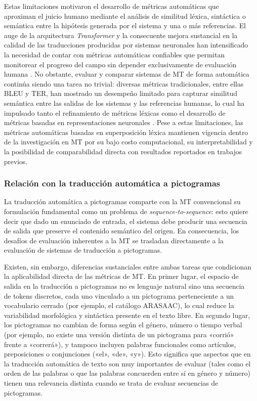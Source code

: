 Estas limitaciones motivaron el desarrollo de métricas automáticas que aproximan el juicio humano mediante el análisis de similitud léxica, sintáctica o semántica entre la hipótesis generada por el sistema y una o más referencias. El auge de la arquitectura \textit{Transformer} y la consecuente mejora sustancial en la calidad de las traducciones producidas por sistemas neuronales han intensificado la necesidad de contar con métricas automáticas confiables que permitan monitorear el progreso del campo sin depender exclusivamente de evaluación humana \cite{lee2023survey}. No obstante, evaluar y comparar sistemas de MT de forma automática continúa siendo una tarea no trivial: diversas métricas tradicionales, entre ellas BLEU y TER, han mostrado un desempeño limitado para capturar similitud semántica entre las salidas de los sistemas y las referencias humanas, lo cual ha impulsado tanto el refinamiento de métricas léxicas como el desarrollo de métricas basadas en representaciones neuronales \cite{lee2023survey}. Pese a estas limitaciones, las métricas automáticas basadas en superposición léxica mantienen vigencia dentro de la investigación en MT por su bajo costo computacional, su interpretabilidad y la posibilidad de comparabilidad directa con resultados reportados en trabajos previos.


\subsubsection{Relación con la traducción automática a pictogramas}


La traducción automática a pictogramas comparte con la MT convencional su formulación fundamental como un problema de \textit{sequence-to-sequence}: esto quiere decir que dado un enunciado de entrada, el sistema debe producir una secuencia de salida que preserve el contenido semántico del origen. En consecuencia, los desafíos de evaluación inherentes a la MT se trasladan directamente a la evaluación de sistemas de traducción a pictogramas.

Existen, sin embargo, diferencias sustanciales entre ambas tareas que condicionan la aplicabilidad directa de las métricas de MT. En primer lugar, el espacio de salida en la traducción a pictogramas no es lenguaje natural sino una secuencia de tokens discretos, cada uno vinculado a un pictograma perteneciente a un vocabulario cerrado (por ejemplo, el catálogo ARASAAC), lo cual reduce la variabilidad morfológica y sintáctica presente en el texto libre. En segundo lugar, los pictogramas no cambian de forma según el género, número o tiempo verbal (por ejemplo, no existe una versión distinta de un pictograma para «corrió» frente a «correrá»), y tampoco incluyen palabras funcionales como artículos, preposiciones o conjunciones («el», «de», «y»). Esto significa que aspectos que en la traducción automática de texto son muy importantes de evaluar (tales como el orden de las palabras o que las palabras concuerden entre sí en género y número) tienen una relevancia distinta cuando se trata de evaluar secuencias de pictogramas.

